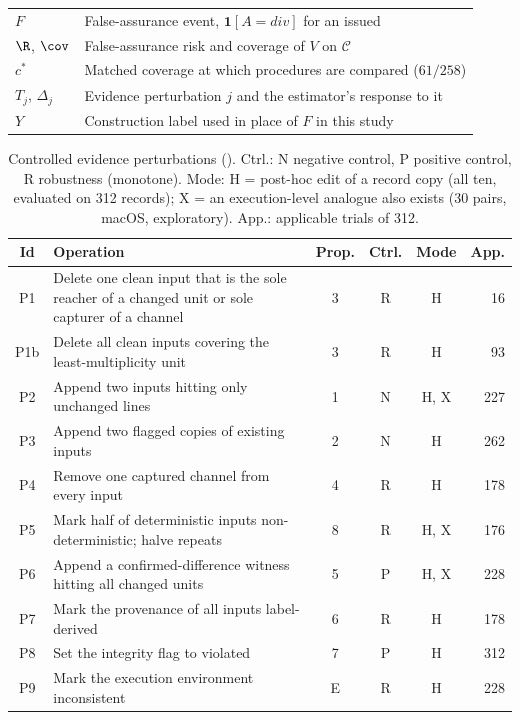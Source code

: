 \begin{table}[!t]
\begin{tabular}{|L{1.25cm}|L{6.1cm}|}
$F$ & False-assurance event, $\mathbf{1}[A=\textit{div}]$ for an issued \NDO{} \\
$\R$, $\cov$ & False-assurance risk and coverage of $V$ on $\mathcal{C}$ \\
$c^\ast$ & Matched coverage at which procedures are compared ($61/258$) \\
$T_j$, $\Delta_j$ & Evidence perturbation $j$ and the estimator's response to it \\
$Y$ & Construction label used in place of $F$ in this study \\
\hline
\end{tabular}
\end{table}

\begin{table}[!t]
\caption{Controlled evidence perturbations (). Ctrl.: N negative control, P positive control, R robustness (monotone). Mode: H = post-hoc edit of a record copy (all ten, evaluated on 312 records); X = an execution-level analogue also exists (30 pairs, macOS, exploratory). App.: applicable trials of 312.}
\label{tab:perturb}
\centering
\scriptsize
\setlength{\tabcolsep}{2.4pt}
\begin{tabular}{|c|L{3.55cm}|c|c|c|r|}
\hline
Id & Operation & Prop. & Ctrl. & Mode & App. \\
\hline
P1 & Delete one clean input that is the sole reacher of a changed unit or sole capturer of a channel & 3 & R & H & 16 \\
P1b & Delete all clean inputs covering the least-multiplicity unit & 3 & R & H & 93 \\
P2 & Append two  inputs hitting only unchanged lines & 1 & N & H, X & 227 \\
P3 & Append two flagged copies of existing inputs & 2 & N & H & 262 \\
P4 & Remove one captured channel from every input & 4 & R & H & 178 \\
P5 & Mark half of deterministic  inputs non-deterministic; halve repeats & 8 & R & H, X & 176 \\
P6 & Append a confirmed-difference witness hitting all changed units & 5 & P & H, X & 228 \\
P7 & Mark the provenance of all inputs label-derived & 6 & R & H & 178 \\
P8 & Set the integrity flag to violated & 7 & P & H & 312 \\
P9 & Mark the execution environment inconsistent & E & R & H & 228 \\
\hline
\end{tabular}
\end{table}


